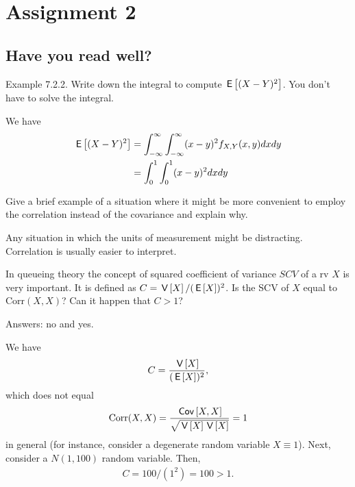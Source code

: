 \documentclass[assignments]{subfiles}
\begin{document}
\setcounter{section}{1}
\section{Assignment 2}


\subsection{Have you read well?}


\begin{exercise}
Example 7.2.2. Write down the integral to compute $\,\mathsf{E}\left[(X-Y)^{2}\right]$. You don't have to solve the integral.
\begin{solution}
We have
\begin{align}
    \,\mathsf{E}\left[(X-Y)^2\right] &= \int_{-\infty}^\infty \int_{-\infty}^\infty (x - y)^2 f_{X,Y}(x,y) dx dy \\
    &=\int_0^1 \int_0^1 (x - y)^2 dx dy
\end{align}
\end{solution}
\end{exercise}

\begin{exercise}
Give a brief example of a situation where it might be more convenient to employ the correlation instead of the covariance and explain why.
\begin{solution}
Any situation in which the units of measurement might be distracting. Correlation is usually easier to interpret.
\end{solution}
\end{exercise}

\begin{exercise}
In queueing theory  the concept of squared coefficient of variance $SCV$ of a rv $X$ is very important. It is defined as $C = \,\mathsf{V}\left[X\right]/(\,\mathsf{E}\left[X\right])^{2}$. Is the SCV of $X$ equal to $\text{Corr}(X,X)$? Can it happen that $C>1$?
\begin{solution}
Answers: no and yes.

We have
\begin{align}
    C = \frac{\,\mathsf{V}\left[X\right]}{(\,\mathsf{E}\left[X\right])^2},
\end{align}
which does not equal
\begin{align}
    \text{Corr}(X,X) = \frac{\,\mathsf{Cov}\left[X,X\right]}{\sqrt{\,\mathsf{V}\left[X\right]\,\mathsf{V}\left[X\right]}} = 1
\end{align}
in general (for instance, consider a degenerate random variable $X \equiv 1$). Next, consider a $N(1,100)$ random variable. Then,
\begin{align}
    C = 100/(1^2) = 100 > 1.
\end{align}
\end{solution}
\end{exercise}
\end{document}
